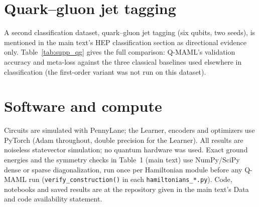 \documentclass[11pt]{article}
\begin{document}


\section{Quark--gluon jet tagging}\label{sec:supp_qg}

A second classification dataset, quark--gluon jet tagging (six qubits, two seeds), is mentioned in
the main text's HEP classification section as directional evidence only. Table~\ref{tab:supp_qg}
gives the full comparison: Q-MAML's validation accuracy and meta-loss against the three classical
baselines used elsewhere in classification (the first-order variant was not run on this dataset).



\section{Software and compute}\label{sec:supp_software}

Circuits are simulated with PennyLane; the Learner, encoders and optimizers use PyTorch (Adam
throughout, double precision for the Learner). All results are noiseless statevector simulation; no
quantum hardware was used. Exact ground energies and the symmetry checks in Table~1 (main text) use
NumPy/SciPy dense or sparse diagonalization, run once per Hamiltonian module before any Q-MAML run
(\texttt{verify\_construction()} in each \texttt{hamiltonians\_*.py}). Code, notebooks and saved
results are at the repository given in the main text's Data and code availability statement.
\end{document}
